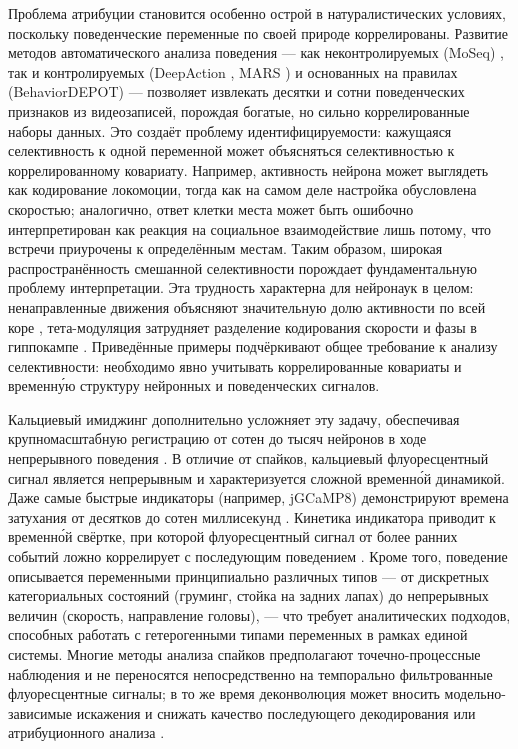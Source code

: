 Проблема атрибуции становится особенно острой в натуралистических условиях, поскольку поведенческие переменные по своей природе коррелированы. Развитие методов автоматического анализа поведения --- как неконтролируемых (MoSeq) \cite{Weinreb2024}, так и контролируемых (DeepAction \cite{Harris2023deepaction}, MARS \cite{Segalin2021}) и основанных на правилах (BehaviorDEPOT) \cite{Gabriel2022} --- позволяет извлекать десятки и сотни поведенческих признаков из видеозаписей, порождая богатые, но сильно коррелированные наборы данных. Это создаёт проблему идентифицируемости: кажущаяся селективность к одной переменной может объясняться селективностью к коррелированному ковариату. Например, активность нейрона может выглядеть как кодирование локомоции, тогда как на самом деле настройка обусловлена скоростью; аналогично, ответ клетки места может быть ошибочно интерпретирован как реакция на социальное взаимодействие лишь потому, что встречи приурочены к определённым местам. Таким образом, широкая распространённость смешанной селективности порождает фундаментальную проблему интерпретации. Эта трудность характерна для нейронаук в целом: ненаправленные движения объясняют значительную долю активности по всей коре \cite{Musall2019}, тета-модуляция затрудняет разделение кодирования скорости и фазы в гиппокампе \cite{Vanderwolf1969, McNaughton1983}. Приведённые примеры подчёркивают общее требование к анализу селективности: необходимо явно учитывать коррелированные ковариаты и временн\'{у}ю структуру нейронных и поведенческих сигналов.

Кальциевый имиджинг дополнительно усложняет эту задачу, обеспечивая крупномасштабную регистрацию от сотен до тысяч нейронов в ходе непрерывного поведения \cite{Chen2013, Zong2022}. В отличие от спайков, кальциевый флуоресцентный сигнал является непрерывным и характеризуется сложной временн\'{о}й динамикой. Даже самые быстрые индикаторы (например, jGCaMP8) демонстрируют времена затухания от десятков до сотен миллисекунд \cite{Zhang2023}. Кинетика индикатора приводит к временн\'{о}й свёртке, при которой флуоресцентный сигнал от более ранних событий ложно коррелирует с последующим поведением \cite{Wei2020}. Кроме того, поведение описывается переменными принципиально различных типов --- от дискретных категориальных состояний (груминг, стойка на задних лапах) до непрерывных величин (скорость, направление головы), --- что требует аналитических подходов, способных работать с гетерогенными типами переменных в рамках единой системы. Многие методы анализа спайков предполагают точечно-процессные наблюдения и не переносятся непосредственно на темпорально фильтрованные флуоресцентные сигналы; в то же время деконволюция может вносить модельно-зависимые искажения и снижать качество последующего декодирования или атрибуционного анализа \cite{Rupprecht2021}.

